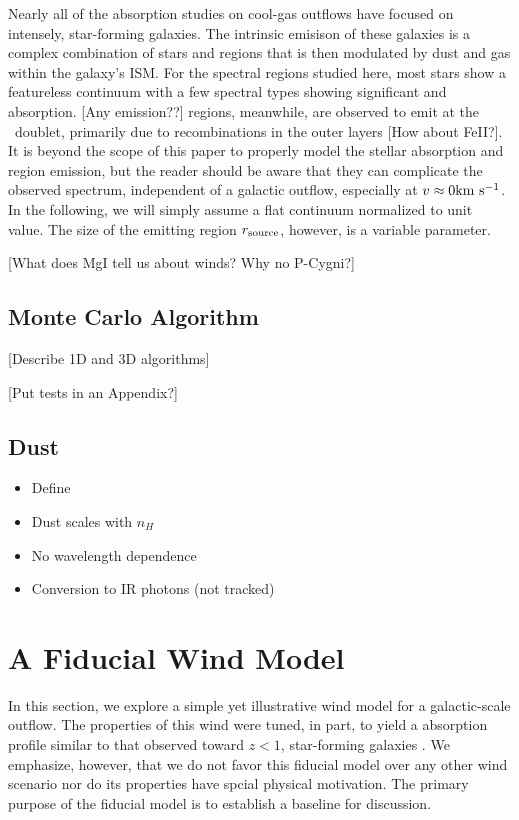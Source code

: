 \documentclass[12pt,preprint]{aastex}
\begin{document}
Nearly all of the absorption studies on cool-gas outflows 
have focused on intensely, star-forming galaxies.  The
intrinsic emisison of these galaxies is a complex combination of
stars and  regions that is then modulated by dust and gas
within the galaxy's ISM.  For the spectral regions studied
here, most stars show a featureless continuum with a few spectral
types showing significant  and  absorption.
[Any emission??]   regions, meanwhile, are observed to emit
at the \mgiid\ doublet, primarily due to recombinations in the outer
layers [How about FeII?].  It is beyond the scope of this paper to
properly model the 
stellar absorption and  region emission, but the reader
should be aware that they can complicate the observed spectrum,
independent of a galactic outflow, especially at $v \approx 0 {\rm km~s^{-1}}$.
In the following, we will simply assume a flat continuum 
normalized to unit value.  The size of the emitting
region $r_{\rm source}$, however, is a variable parameter.

[What does MgI tell us about winds?  Why no P-Cygni?]

\subsection{Monte Carlo Algorithm}

[Describe 1D and 3D algorithms]

[Put tests in an Appendix?]

\subsection{Dust}
\label{sec:dust_method}

\begin{itemize}
\item Define \taud
\item Dust scales with $n_H$
\item No wavelength dependence
\item Conversion to IR photons (not tracked)
\end{itemize}



\section{A Fiducial Wind Model}
\label{sec:fiducial}

In this section, we explore a simple yet illustrative wind model for
a galactic-scale outflow.  The properties of this wind were tuned, in
part, to yield a  absorption profile 
similar to that observed toward $z<1$, star-forming galaxies
\citep{wcp+09,rubin10b}.  We emphasize, however, that we do not
favor this fiducial model over any other wind scenario nor do its
properties have spcial physical motivation.
The primary purpose of the fiducial model is to establish a baseline
for discussion.
\end{document}
